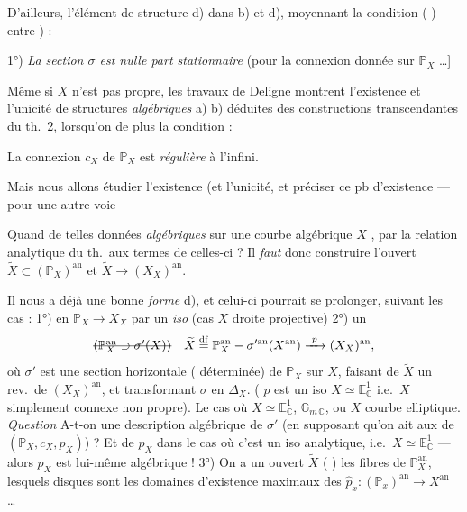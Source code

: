 \documentclass[11pt,a4paper]{article}
\begin{document}
D'ailleurs, l'élément de structure d)  dans b) et d), moyennant la condition ( \struck{\ill{}} ) \struck{\ill{} \ill{}} entre ) :

1°) \emph{La section $\sigma$ est nulle part stationnaire} (pour la connexion donnée \ill{} sur $\mathbb{P}_X$ …]

Même si $X$ n'est pas propre, \struck{\ill{}} les travaux de Deligne montrent l'existence et l'unicité de structures \emph{algébriques} a) b)  déduites des constructions transcendantes du th.~2, lorsqu'on   de plus la condition :

\struck{\ill{}} La connexion $c_X$ de $\mathbb{P}_X$ est \emph{régulière} à l'infini.

Mais nous allons étudier l'existence (et l'unicité, et préciser ce pb d'existence — pour une autre voie

Quand  de telles données \emph{algébriques} sur une courbe algébrique $X$ , \struck{\ill{}}   par la relation analytique du th.\ aux termes de celles-ci ? Il \emph{faut} donc construire l'ouvert $\widetilde{X} \subset (\mathbb{P}_X)^{\mathrm{an}}$ et $\widetilde{X} \longrightarrow (X_X)^{\mathrm{an}}$.

Il nous a déjà une bonne \emph{forme} d), et celui-ci pourrait se prolonger, suivant les cas : 1°) en $\mathbb{P}_X \to X_X$ par un \emph{iso} (cas $X$ droite projective) 2°) un \struck{\ill{}} 
\[
\text{\struck{$(\mathbb{P}_X^{\mathrm{an}} \supset \sigma'(X))$}}\quad \widetilde{X} \overset{\mathrm{df}}{=} \mathbb{P}_X^{\mathrm{an}} - \sigma'^{\mathrm{an}}(X^{\mathrm{an}}) \xrightarrow{\ p\ } (X_X)^{\mathrm{an}},
\]
où $\sigma'$ est une section horizontale ( déterminée) de $\mathbb{P}_X$ sur $X$, faisant de $\widetilde{X}$ un rev.\ de $(X_X)^{\mathrm{an}}$, et transformant $\sigma$ en $\Delta_X$. (\struck{\ill{}}  $p$ est un iso \struck{\ill{}} $X \simeq \mathbb{E}^{1}_{\mathbb{C}}$ i.e.\ $X$ simplement connexe non propre). Le cas où $X \simeq \mathbb{E}^{1}_{\mathbb{C}}$, $\mathbb{G}_{m\,\mathbb{C}}$, ou $X$ courbe elliptique. \emph{Question} A-t-on une description  algébrique de $\sigma'$ (en supposant qu'on ait aux  de $(\mathbb{P}_X, c_X, p_X)$) ? Et de $p_X$ dans le cas où c'est un iso analytique, i.e.\ $X \simeq \mathbb{E}^{1}_{\mathbb{C}}$ — alors $p_X$ est lui-même algébrique ! 3°) On a un ouvert $\widetilde{X}$ \struck{\ill{}} ( ) \struck{\ill{}}  les fibres de $\mathbb{P}_X^{\mathrm{an}}$, lesquels disques sont les domaines d'existence maximaux des $\hat{p}_x : (\mathbb{P}_x)^{\mathrm{an}} \longrightarrow X^{\mathrm{an}}$ …
\end{document}
